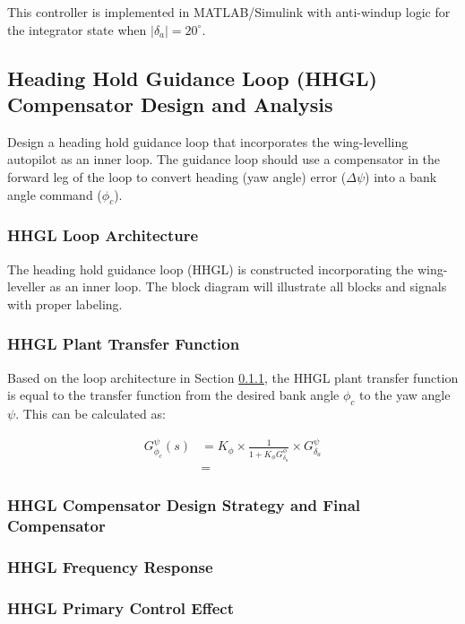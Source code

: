 This controller is implemented in MATLAB/Simulink with anti-windup logic for the integrator state when $|\delta_a| = 20^\circ$.

\subsection{Heading Hold Guidance Loop (HHGL) Compensator Design and Analysis}

Design a heading hold guidance loop that incorporates the wing-levelling autopilot as an inner loop. The guidance loop should use a compensator in the forward leg of the loop to convert heading (yaw angle) error ($\Delta \psi$) into a bank angle command ($\phi_c$).

\subsubsection{HHGL Loop Architecture}\label{sec:HHGL_architecture}

The heading hold guidance loop (HHGL) is constructed incorporating the wing-leveller as an inner loop. The block diagram will illustrate all blocks and signals with proper labeling.

\subsubsection{HHGL Plant Transfer Function}

Based on the loop architecture in Section \ref{sec:HHGL_architecture}, the HHGL plant transfer function is equal to the transfer function from the desired bank angle $\phi_c$ to the yaw angle $\psi$. This can be calculated as:

\begin{align*}
G_{\phi_c}^\psi (s) &= K_\phi \times \frac{1}{1 + K_\phi G_{\delta_a}^\phi} \times G_{\delta_a}^\psi \\
&= 
\end{align*}

\subsubsection{HHGL Compensator Design Strategy and Final Compensator}

\subsubsection{HHGL Frequency Response}

\subsubsection{HHGL Primary Control Effect}

